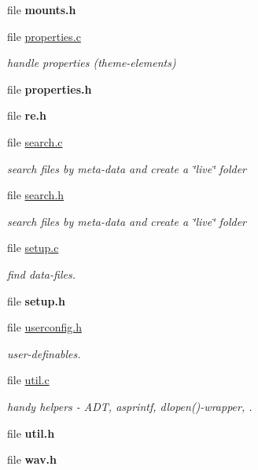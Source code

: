 \begin{CompactItemize}
\item 
file {\bf mounts.h}
\item 
file \hyperlink{properties_8c}{properties.c}
\begin{CompactList}\small\item\em handle properties (theme-elements) \item\end{CompactList}

\item 
file {\bf properties.h}
\item 
file {\bf re.h}
\item 
file \hyperlink{search_8c}{search.c}
\begin{CompactList}\small\item\em search files by meta-data and create a \char`\"{}live\char`\"{} folder \item\end{CompactList}

\item 
file \hyperlink{search_8h}{search.h}
\begin{CompactList}\small\item\em search files by meta-data and create a \char`\"{}live\char`\"{} folder \item\end{CompactList}

\item 
file \hyperlink{setup_8c}{setup.c}
\begin{CompactList}\small\item\em find data-files. \item\end{CompactList}

\item 
file {\bf setup.h}
\item 
file \hyperlink{userconfig_8h}{userconfig.h}
\begin{CompactList}\small\item\em user-definables. \item\end{CompactList}

\item 
file \hyperlink{util_8c}{util.c}
\begin{CompactList}\small\item\em handy helpers - ADT, asprintf, dlopen()-wrapper, . \item\end{CompactList}

\item 
file {\bf util.h}
\item 
file {\bf wav.h}
\end{CompactItemize}
